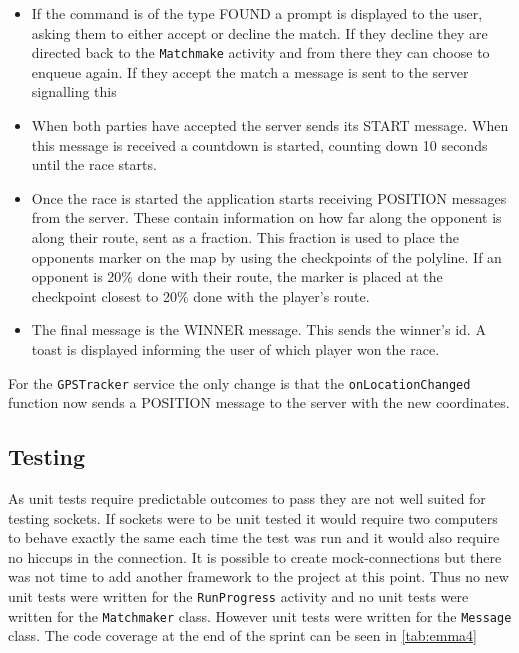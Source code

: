 \begin{itemize}
\item If the command is of the type FOUND a prompt is displayed to the user, asking them to either accept or decline the match. If they decline they are directed back to the \texttt{Matchmake} activity and from there they can choose to enqueue again. If they accept the match a message is sent to the server signalling this
\item When both parties have accepted the server sends its START message. When this message is received a countdown is started, counting down 10 seconds until the race starts.
\item Once the race is started the application starts receiving POSITION messages from the server. These contain information on how far along the opponent is along their route, sent as a fraction. This fraction is used to place the opponents marker on the map by using the checkpoints of the polyline. If an opponent is 20\% done with their route, the marker is placed at the checkpoint closest to 20\% done with the player's route. 
\item The final message is the WINNER message. This sends the winner's id. A toast is displayed informing the user of which player won the race.
\end{itemize}
\vspace{10pt}

For the \texttt{GPSTracker} service the only change is that the \texttt{onLocationChanged} function now sends a POSITION message to the server with the new coordinates.

\subsection{Testing}
As unit tests require predictable outcomes to pass they are not well suited for testing sockets. If sockets were to be unit tested it would require two computers to behave exactly the same each time the test was run and it would also require no hiccups in the connection. It is possible to create mock-connections but there was not time to add another framework to the project at this point. Thus no new unit tests were written for the \texttt{RunProgress} activity and no unit tests were written for the \texttt{Matchmaker} class. However unit tests were written for the \texttt{Message} class.
The code coverage at the end of the sprint can be seen in \autoref{tab:emma4}

